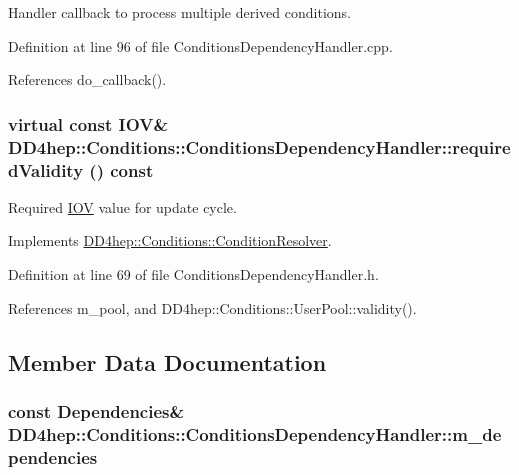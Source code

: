Handler callback to process multiple derived conditions. 

Definition at line 96 of file ConditionsDependencyHandler.cpp.

References do\_\-callback().\hypertarget{class_d_d4hep_1_1_conditions_1_1_conditions_dependency_handler_a402d7a0ab3c92562382b8595205efd86}{
\subsubsection[{requiredValidity}]{\setlength{\rightskip}{0pt plus 5cm}virtual const {\bf IOV}\& DD4hep::Conditions::ConditionsDependencyHandler::requiredValidity () const}}
\label{class_d_d4hep_1_1_conditions_1_1_conditions_dependency_handler_a402d7a0ab3c92562382b8595205efd86}


Required \hyperlink{class_d_d4hep_1_1_i_o_v}{IOV} value for update cycle. 

Implements \hyperlink{class_d_d4hep_1_1_conditions_1_1_condition_resolver_a96b82698fa08d7b1ecb46cd36f5e543f}{DD4hep::Conditions::ConditionResolver}.

Definition at line 69 of file ConditionsDependencyHandler.h.

References m\_\-pool, and DD4hep::Conditions::UserPool::validity().

\subsection{Member Data Documentation}
\hypertarget{class_d_d4hep_1_1_conditions_1_1_conditions_dependency_handler_a8ee531f77ba4feb9f1c767f59d0f607a}{
\subsubsection[{m\_\-dependencies}]{\setlength{\rightskip}{0pt plus 5cm}const {\bf Dependencies}\& {\bf DD4hep::Conditions::ConditionsDependencyHandler::m\_\-dependencies}}}
\label{class_d_d4hep_1_1_conditions_1_1_conditions_dependency_handler_a8ee531f77ba4feb9f1c767f59d0f607a}


